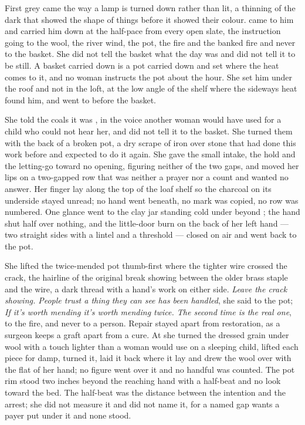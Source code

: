 \scenebreak

First grey came the way a lamp is turned down rather than lit, a thinning of the dark that showed the shape of things before it showed their colour.  came to him and carried him down  at the half-pace from every open slate, the instruction going to the wool, the river wind, the pot, the fire and the banked fire and never to the basket. She did not tell the basket what the day was and did not tell it to be still. A basket carried down is a pot carried down and set where the heat comes to it, and no woman instructs the pot about the hour. She set him under the roof and not in the loft, at the low angle of the shelf where the sideways heat found him, and went to  before the basket.

She told the coals it was , in the voice another woman would have used for a child who could not hear her, and did not tell it to the basket. She turned them with the back of a broken pot, a dry scrape of iron over stone that had done this work before and expected to do it again. She gave the small intake, the hold and the letting-go toward no opening, figuring neither of the two gaps, and moved her lips on a two-gapped row that was neither a prayer nor a count and wanted no answer. Her finger lay along the top of the loaf shelf so the charcoal on its underside stayed unread; no hand went beneath, no mark was copied, no row was numbered. One glance went to the clay jar standing cold under  beyond ; the hand shut half over nothing, and the little-door burn on the back of her left hand --- two straight sides with a lintel and a threshold --- closed on air and went back to the pot.

She lifted the twice-mended pot thumb-first where the tighter wire crossed the crack, the hairline of the original break showing between the older brass staple and the wire, a dark thread with a hand's work on either side. \emph{Leave the crack showing. People trust a thing they can see has been handled}, she said to the pot; \emph{If it's worth mending it's worth mending twice. The second time is the real one}, to the fire, and never to a person. Repair stayed apart from restoration, as a surgeon keeps a graft apart from a cure. At  she turned the dressed grain under wool with a touch lighter than a woman would use on a sleeping child, lifted each piece for damp, turned it, laid it back where it lay and drew the wool over with the flat of her hand; no figure went over it and no handful was counted. The pot rim stood two inches beyond the reaching hand with a half-beat and no look toward the bed. The half-beat was the distance between the intention and the arrest; she did not measure it and did not name it, for a named gap wants a payer put under it and none stood.

